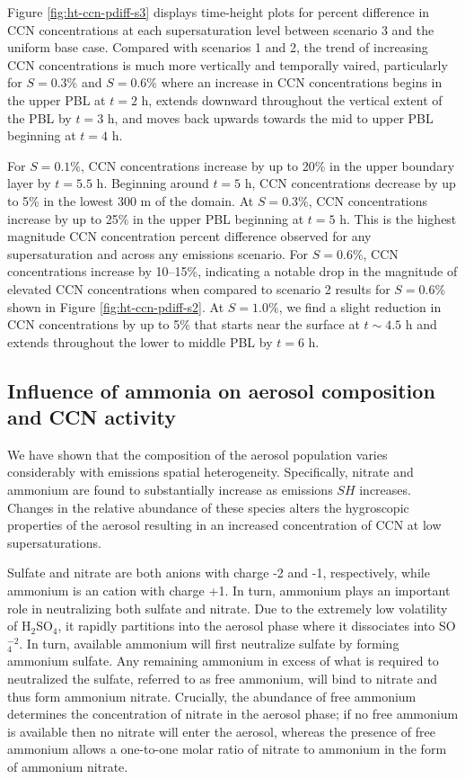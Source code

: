 Figure \ref{fig:ht-ccn-pdiff-s3} displays time-height plots for percent difference in CCN concentrations at each supersaturation level between scenario 3 and the uniform base case. 
Compared with scenarios 1 and 2, the trend of increasing CCN concentrations is much more vertically and temporally vaired, particularly for $S=0.3\%$ and $S=0.6\%$ where an increase in CCN concentrations begins in the upper PBL at $t=2$ h, extends downward throughout the vertical extent of the PBL by $t=3$ h, and moves back upwards towards the mid to upper PBL beginning at $t=4$ h. 

For $S=0.1\%$, CCN concentrations increase by up to 20\% in the upper boundary layer by $t=5.5$ h. Beginning around $t=5$ h, CCN concentrations decrease by up to 5\% in the lowest 300 m of the domain. At $S=0.3\%$, CCN concentrations increase by up to 25\% in the upper PBL beginning at $t=5$ h. This is the highest magnitude CCN concentration percent difference observed for any supersaturation and across any emissions scenario. For $S=0.6\%$, CCN concentrations increase by 10--15\%, indicating a notable drop in the magnitude of elevated CCN concentrations when compared to scenario 2 results for $S=0.6\%$ shown in Figure \ref{fig:ht-ccn-pdiff-s2}. At $S=1.0\%$, we find a slight reduction in CCN concentrations by up to 5\% that starts near the surface at $t\sim4.5$ h and extends throughout the lower to middle PBL by $t=6$ h. 

\subsection{Influence of ammonia on aerosol composition and CCN activity}

We have shown that the composition of the aerosol population varies considerably with emissions spatial heterogeneity. Specifically, nitrate and ammonium are found to substantially increase as emissions $SH$ increases. Changes in the relative abundance of these species alters the hygroscopic properties of the aerosol resulting in an increased concentration of CCN at low supersaturations. 

Sulfate and nitrate are both anions with charge -2 and -1, respectively, while ammonium is an cation with charge +1. In turn, ammonium plays an important role in neutralizing both sulfate and nitrate. Due to the extremely low volatility of H$_2$SO$_4$, it rapidly partitions into the aerosol phase where it dissociates into SO$_4^{-2}$. In turn, available ammonium will first neutralize sulfate by forming ammonium sulfate. Any remaining ammonium in excess of what is required to neutralized the sulfate, referred to as free ammonium, will bind to nitrate and thus form ammonium nitrate. Crucially, the abundance of free ammonium determines the concentration of nitrate in the aerosol phase; if no free ammonium is available then no nitrate will enter the aerosol, whereas the presence of free ammonium allows a one-to-one molar ratio of nitrate to ammonium in the form of ammonium nitrate.  


